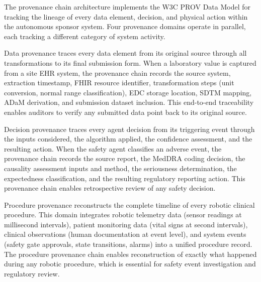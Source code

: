 The provenance chain architecture implements the W3C PROV Data Model \cite{w3c-prov} for
tracking the lineage of every data element, decision, and physical action within the
autonomous sponsor system. Four provenance domains operate in parallel, each tracking a
different category of system activity.

Data provenance traces every data element from its original source through all
transformations to its final submission form. When a laboratory value is captured from a
site EHR system, the provenance chain records the source system, extraction timestamp,
FHIR resource identifier, transformation steps (unit conversion, normal range
classification), EDC storage location, SDTM mapping, ADaM derivation, and submission
dataset inclusion. This end-to-end traceability enables auditors to verify any submitted
data point back to its original source.

Decision provenance traces every agent decision from its triggering event through the
inputs considered, the algorithm applied, the confidence assessment, and the resulting
action. When the safety agent classifies an adverse event, the provenance chain records
the source report, the MedDRA coding decision, the causality assessment inputs and
method, the seriousness determination, the expectedness classification, and the resulting
regulatory reporting action. This provenance chain enables retrospective review of any
safety decision.

Procedure provenance reconstructs the complete timeline of every robotic clinical procedure.
This domain integrates robotic telemetry data (sensor readings at millisecond intervals),
patient monitoring data (vital signs at second intervals), clinical observations (human
documentation at event level), and system events (safety gate approvals, state transitions,
alarms) into a unified procedure record. The procedure provenance chain enables
reconstruction of exactly what happened during any robotic procedure, which is essential
for safety event investigation and regulatory review.

